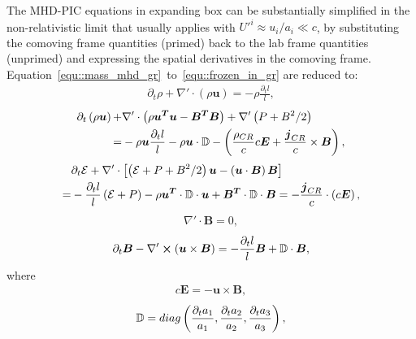 \documentclass[fleqn,usenatbib]{mnras}
\begin{document}
The MHD-PIC equations in expanding box can be substantially simplified in the non-relativistic limit that usually applies with $U'^i \approx u_i / a_i \ll c$, by substituting the comoving frame quantities (primed) back to the lab frame quantities (unprimed) and expressing the spatial derivatives in the comoving frame. Equation~\ref{equ::mass_mhd_gr}~to~\ref{equ::frozen_in_gr} are reduced to:
\begin{align}
    \partial_t \rho + \nabla' \cdot \left(\rho \boldsymbol{u}\right) = - \rho \frac{\partial_t l}{l}  , \label{equ::expand_mass_mhd} 
\end{align}
\begin{align}
    \partial_t \left(\rho \boldsymbol{u}\right) + &\nabla' \cdot \left(\rho \boldsymbol{u^T} \boldsymbol{u} - \boldsymbol{B^T} \boldsymbol{B}\right) + \nabla' \left(P + B^2 / 2\right) \notag \\ =& - \rho \boldsymbol{u} \frac{\partial_t l}{l} - \rho \boldsymbol{u} \cdot \mathbb{D}  -\left(\frac{\rho_{CR}}{c} c\boldsymbol{E} + \frac{\boldsymbol{j}_{CR}}{c} \times \boldsymbol{B} \right), \label{equ::expand_momentum_mhd}
\end{align}
\begin{align}
    &\partial_t \mathcal{E} + \nabla' \cdot \left[\left(\mathcal{E} + P + B^2 / 2\right) \boldsymbol{u} - \left(\boldsymbol{u} \cdot \boldsymbol{B}\right) \boldsymbol{B} \right] \notag   \\=& -\frac{\partial_t l}{l} \left(\mathcal{E} + P\right)  - \rho \boldsymbol{u^T} \cdot \mathbb{D} \cdot \boldsymbol{u} + \boldsymbol{B^T} \cdot \mathbb{D} \cdot \boldsymbol{B} = - \frac{\boldsymbol{j}_{CR}}{c} \cdot \left(c\boldsymbol{E}\right), \label{equ::expand_energy_mhd}
\end{align}
\begin{align}
    \nabla' \cdot \boldsymbol{B} = 0, \label{equ::expand_gauss}
\end{align}
\begin{align}
    \partial_{t} \boldsymbol{B}  - \nabla' \cross \left(\boldsymbol{u}\times\boldsymbol{B}\right) = - \frac{\partial_t l}{l}\boldsymbol{B} + \mathbb{D} \cdot \boldsymbol{B}, \label{equ::expand_field} 
\end{align}
where
\begin{align}
    c\boldsymbol{E} = - \boldsymbol{u} \times \boldsymbol{B},
\end{align}
\begin{align}
    \mathbb{D} = diag\left(\frac{\partial_t a_1}{a_1}, \frac{\partial_t a_2}{a_2},\frac{\partial_t a_3}{a_3}\right),\notag 
\end{align}
\end{document}
